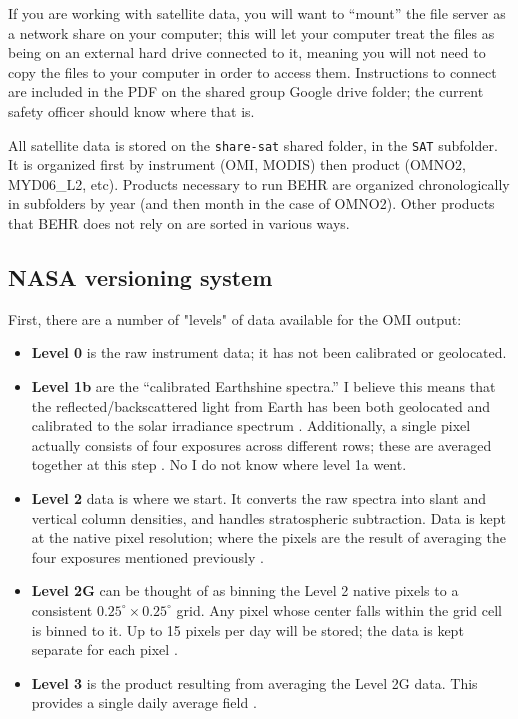 \documentclass[12pt]{article}
\begin{document}
		If you are working with satellite data, you will want to ``mount'' the file server as a network share on your computer; this will let your computer treat the files as being on an external hard drive connected to it, meaning you will not need to copy the files to your computer in order to access them.  Instructions to connect are included in the PDF on the shared group Google drive folder; the current safety officer should know where that is.
		
		All satellite data is stored on the \texttt{share-sat} shared folder, in the \texttt{SAT} subfolder. It is organized first by instrument (OMI, MODIS) then product (OMNO2, MYD06\_L2, etc). Products necessary to run BEHR are organized chronologically in subfolders by year (and then month in the case of OMNO2). Other products that BEHR does not rely on are sorted in various ways.
	
	\subsection{NASA versioning system}
	
	First, there are a number of "levels" of data available for the OMI output:
	\begin{itemize}
	\item \textbf{Level 0} is the raw instrument data; it has not been calibrated or geolocated.
	\item \textbf{Level 1b} are the ``calibrated Earthshine spectra.'' I believe this means that the reflected/backscattered light from Earth has been both geolocated and calibrated to the solar irradiance spectrum \citep{knmi-level0-1b, van-der-Oord06}. Additionally, a single pixel actually consists of four exposures across different rows; these are averaged together at this step \citep{van-der-Oord06}. No I do not know where level 1a went.
	\item \textbf{Level 2} data is where we start. It converts the raw spectra into slant and vertical column densities, and handles stratospheric subtraction. Data is kept at the native pixel resolution; where the pixels are the result of averaging the four exposures mentioned previously \citep{omi-readme, bucsela13, marchenko15}.
	\item \textbf{Level 2G} can be thought of as binning the Level 2 native pixels to a consistent $0.25^\circ \times 0.25^\circ$ grid. Any pixel whose center falls within the grid cell is binned to it. Up to 15 pixels per day will be stored; the data is kept separate for each pixel \citep{omi-readme}.
	\item \textbf{Level 3} is the product resulting from averaging the Level 2G data. This provides a single daily average field \citep{omi-readme}.
	\end{itemize}	
	
\end{document}
